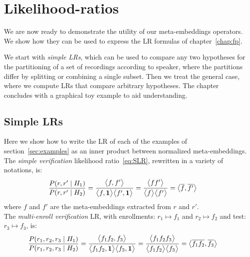 \documentclass[a4paper,oneside,12pt,english]{report}
\def\expv#1#2{\bigl\langle#1\bigr\rangle_{#2}}
\def\dot#1#2{\expv{#1,#2}{}}
\def\normal#1{\overline{#1}}
\begin{document}
\chapter{Likelihood-ratios}
We are now ready to demonstrate the utility of our meta-embeddings operators. We show how they can be used to express the LR formulas of chapter~\ref{chap:fp}. 

We start with \emph{simple LRs}, which can be used to compare any two hypotheses for the partitioning of a set of recordings according to speaker, where the partitions differ by splitting or combining a single subset. Then we treat the general case, where we compute LRs that compare arbitrary hypotheses. The chapter concludes with a graphical toy example to aid understanding.

 

\section{Simple LRs}
\label{sec:simpleLR}
Here we show how to write the LR of each of the examples of section~\ref{sec:examples} as an inner product between normalized meta-embeddings.\\

\noindent The \emph{simple verification} likelihood ratio~\eqref{eq:SLR}, rewritten in a variety of notations, is:
\begin{align}
\label{eq:slrdot}
\frac{P(r,r'\mid H_1)}{P(r,r'\mid H_2)} &= \frac{\dot{f}{f'}}{\dot{f}{\onevec}\dot{f'}{\onevec}}
= \frac{\expv{ff'}{}}{\expv{f}{}\expv{f'}{}}
= \dot{\normal{f}}{\normal{f'}}
\end{align}
where $f$ and $f'$ are the meta-embeddings extracted from $r$ and $r'$. \\

\noindent The \emph{multi-enroll verification} LR, with enrollments: $r_1\mapsto f_1$ and $r_2\mapsto f_2$ and test: $r_3\mapsto f_3$, is:
\begin{align}
\label{eq:mlrdot}
\frac{P(r_1,r_2,r_3\mid H_1)}{P(r_1,r_2,r_3\mid H_2)} &= \frac{\dot{f_1f_2}{f_3}}{\dot{f_1f_2}{\onevec}\dot{f_3}{\onevec}}
= \frac{\expv{f_1f_2f_3}{}}{\expv{f_1f_2}{}\expv{f_3}{}}
= \dot{\normal{f_1f_2}}{\normal{f_3}}
\end{align} \\
\end{document}
